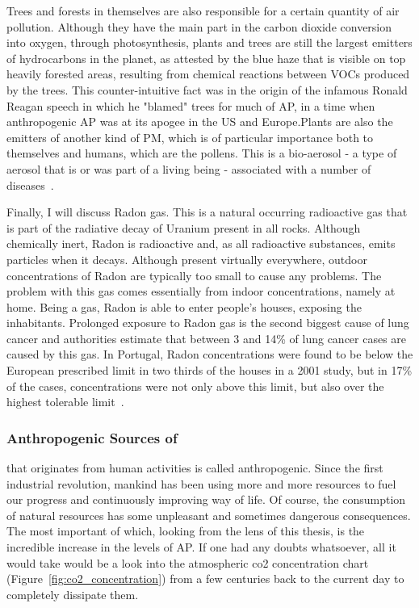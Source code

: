 Trees and forests in themselves are also responsible for a certain
quantity of air pollution. Although they have the main part in the
carbon dioxide conversion into oxygen, through photosynthesis, plants
and trees are still the largest emitters of hydrocarbons in the planet,
as attested by the blue haze that is visible on top heavily forested
areas, resulting from chemical reactions between \gls{VOC}s produced by
the trees. This counter-intuitive fact was in the origin of the infamous
Ronald Reagan speech in which he "blamed" trees for much of \gls{AP}, in
a time when anthropogenic \gls{AP} was at its apogee in the US and
Europe.Plants are also the emitters of another kind of \gls{PM}, which
is of particular importance both to themselves and humans, which are the
pollens. This is a bio-aerosol - a type of aerosol that is or was part
of a living being - associated with a number of
diseases~\cite{Vallero2014}.

Finally, I will discuss Radon gas. This is a natural occurring
radioactive gas that is part of the radiative decay of Uranium present
in all rocks. Although chemically inert, Radon is radioactive and, as
all radioactive substances, emits particles when it decays. Although
present virtually everywhere, outdoor concentrations of Radon are
typically too small to cause any problems. The problem with this gas
comes essentially from indoor concentrations, namely at home. Being a
gas, Radon is able to enter people's houses, exposing the inhabitants.
Prolonged exposure to Radon gas is the second biggest cause of lung
cancer and authorities estimate that between 3 and 14\% of lung cancer
cases are caused by this gas. In Portugal, Radon concentrations were
found to be below the European prescribed limit in two thirds of the
houses in a 2001 study, but in 17\% of the cases, concentrations were
not only above this limit, but also over the highest tolerable
limit~\cite{Vallero2014, WorldHealthOrganization2016, ProTeste2003}.


\subsubsection{Anthropogenic Sources of }%
\label{ssub:anthropogenic_sources_of_ap}

 that originates from human activities is called
anthropogenic. Since the first industrial revolution, mankind has been
using more and more resources to fuel our progress and continuously
improving way of life. Of course, the consumption of natural resources
has some unpleasant and sometimes dangerous consequences. The most
important of which, looking from the lens of this thesis, is the
incredible increase in the levels of \gls{AP}. If one had any doubts
whatsoever, all it would take would be a look into the atmospheric
\gls{co2} concentration chart (Figure~\ref{fig:co2_concentration}) from
a few centuries back to the current day to completely dissipate them.


